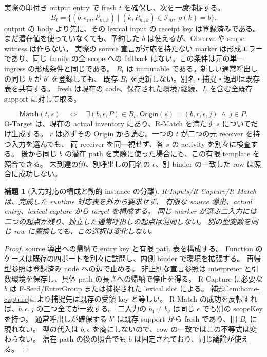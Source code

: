 \documentclass[11pt,a4paper]{article}
\newtheorem{lemma}[definition]{補題}
\begin{document}
実際の印付き output entry で fresh \(t\) を確保し、次を\emph{一度}捕捉する。
\[
 B_t=\{(b,\epsilon_m,P_{m,k})\mid
             (k,P_{m,k})\in\mathcal I_m,\ \rho(k)=b\}.
 \tag{R-Capture}
\]
output の body より先に、その lexical input の receipt key は登録済みである。
まだ潜在値を使っていなくても、予約した \(b\) は使えるが、Observe や scope witness は作らない。
実際の source 宣言が対応を持たない marker は形成エラーであり、同じ family の全 scope への
fallback はない。この条件は元の単一 ingress の形成条件と同じである。
\(B_t\) は immutable である。新しい通常呼出しの同じ \(k\) が \(b'\) を登録しても、
既存 \(B_t\) を更新しない。別名・捕捉・返却は既存表を共有する。
fresh は現在の code、保存された環境/継続、\(L\) を含む全既存 support に対して取る。

\[
 \mathsf{Match}(t,s)\quad\Longleftrightarrow\quad
 \exists(b,\epsilon,P)\in B_t.\
       \mathsf{Origin}(s)=(b,r,\epsilon,j)\ \land\ j\in P.
 \tag{R-Match}
\]
O-Target は、現在の actual inventory にあり、R-Match を満たす \(s\) についてだけ生成する。
\(r\) は必ずその Origin から読む。一つの \(t\) が二つの元 receiver を持つ入力を選んでも、
両 receiver を同一視せず、各 \(s\) の activity を別々に検査する。
後から同じ \(b\) の潜在 path を実際に使った場合にも、この有限 template を照合できる。
未到達の値、別呼出しの同名の \(\epsilon\)、別 binder の一致した row は照合に成功しない。

\begin{lemma}[入力対応の構成と動的 instance の分離]
\label{lem:release-inputs}
R-Inputs/R-Capture/R-Match は、完成した runtime 対応表を外から要求せず、
有限な source 導出、actual entry、lexical capture から target を構成する。
同じ marker が選ぶ二入力には二つの起点が残り、独立した通常呼出しの起点は混同しない。
別の型変数を同じ row に置換しても、この選択は変化しない。
\end{lemma}
\begin{proof}
source 導出への帰納で entry key と有限 path 表を構成する。
Function のケースは既存の四ポートを別々に訪問し、内側 binder で環境を拡張する。
再帰型参照は登録済み node への辺で止める。
非正則な宣言参照は interpreter と引数環境を保存し、具体 path の長さへの帰納で停止を得る。
R-Capture に必要な \(b\) は F-Seed/EnterGroup または捕捉された lexical slot による。
補題\ref{lem:home-capture}により捕捉先は既存の受領 key と等しい。
R-Match の成功を反転すれば、\(b,\epsilon,j\) の三つ全てが一致する。
二入力の \(b_1\ne b_2\) は同じ \(\epsilon\) でも別の scopeKey を持つ。
通常呼出しが確保する \(b'\) は既存 support から fresh であり、旧 \(B_t\) に現れない。
型の代入は \(b,\epsilon\) を商にしないので、row の一致ではこの不等式は変わらない。
潜在 path の後の照合でも \(b\) は固定されており、同じ議論が使える。
\end{proof}
\end{document}
